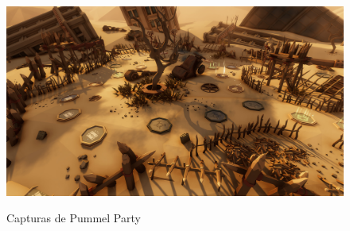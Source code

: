\vfill
\begin{figure}[H]
    \centering
    \begin{minipage}{0.40\textwidth}
        \centering
        \includegraphics[width=1.0\textwidth]{5-Cuerpo/Chapter3/PMP3.jpg} %
        \label{PMP-Paisaje}
    \end{minipage}
    \caption{Capturas de Pummel Party}
\end{figure}